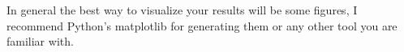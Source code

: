 \documentclass{project-logbook}
\begin{document}
		\begin{HighlightedNote}{}
			In general the best way to visualize your results will be some figures, I recommend Python's matplotlib for generating them or any other tool you are familiar with.
		\end{HighlightedNote}




\end{document}
